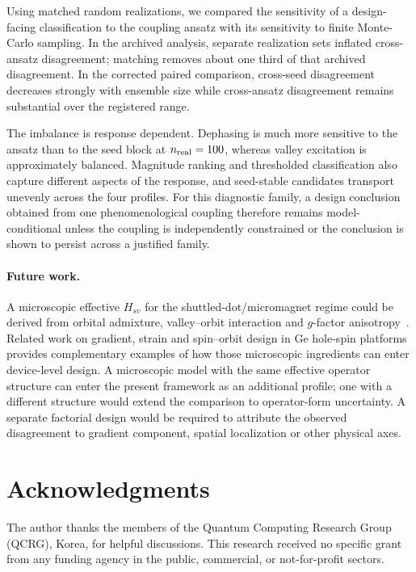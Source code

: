 \documentclass[aip,jap,reprint,superscriptaddress,longbibliography,floatfix]{revtex4-2}
\begin{document}
Using matched random realizations, we compared the sensitivity of a
design-facing classification to the coupling ansatz with its sensitivity to
finite Monte-Carlo sampling. In the archived analysis, separate realization sets inflated cross-ansatz
disagreement; matching removes about one third of that archived disagreement. In the corrected paired comparison,
cross-seed disagreement decreases strongly with ensemble size while
cross-ansatz disagreement remains substantial over the registered range.

The imbalance is response dependent. Dephasing is much more sensitive to the
ansatz than to the seed block at $n_{\rm real}=100$, whereas valley excitation
is approximately balanced. Magnitude ranking and thresholded classification
also capture different aspects of the response, and seed-stable candidates
transport unevenly across the four profiles. For this diagnostic family, a
design conclusion obtained from one phenomenological coupling therefore
remains model-conditional unless the coupling is independently constrained or
the conclusion is shown to persist across a justified family.

\paragraph{Future work.}
A microscopic effective $H_{sv}$ for the shuttled-dot/micromagnet regime could
be derived from orbital admixture, valley--orbit interaction and $g$-factor
anisotropy~\cite{friesen_theory_2010,hosseinkhani_theory_2022,zhang_controlling_2021}.
Related work on gradient, strain and spin--orbit design in Ge hole-spin
platforms~\cite{sarkar_effect_2025,mauro_strain_2025,geyer_anisotropic_2024,hendrickx_sweet-spot_2024,jin_probing_2024}
provides complementary examples of how those microscopic ingredients can enter
device-level design. A microscopic model with the same effective
operator structure can enter the present framework as an additional profile;
one with a different structure would extend the comparison to operator-form
uncertainty. A separate factorial design would be required to attribute the
observed disagreement to gradient component, spatial localization or other
physical axes.


\section*{Acknowledgments}
The author thanks the members of the Quantum Computing Research Group
(QCRG), Korea, for helpful discussions. This research received no specific
grant from any funding agency in the public, commercial, or not-for-profit
sectors.
\end{document}
